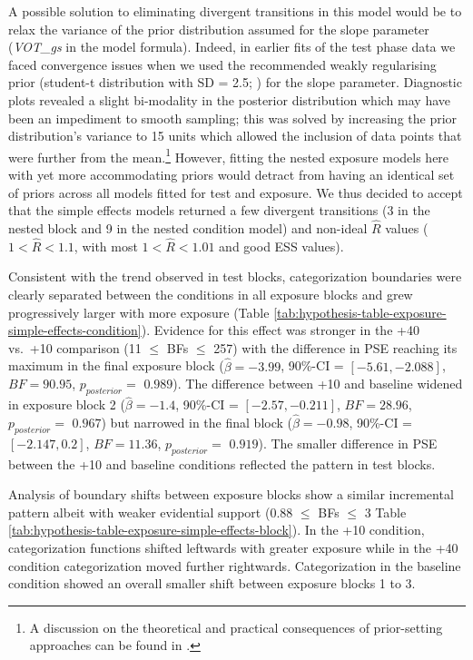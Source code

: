 \documentclass[
  11pt,
  man,mask,floatsintext]{apa6}
\begin{document}
A possible solution to eliminating divergent transitions in this model would be to relax the variance of the prior distribution assumed for the slope parameter (\emph{VOT\_gs} in the model formula). Indeed, in earlier fits of the test phase data we faced convergence issues when we used the recommended weakly regularising prior (student-t distribution with SD = 2.5; \textcite{gelman-prior2008}) for the slope parameter. Diagnostic plots revealed a slight bi-modality in the posterior distribution which may have been an impediment to smooth sampling; this was solved by increasing the prior distribution's variance to 15 units which allowed the inclusion of data points that were further from the mean.\footnote{A discussion on the theoretical and practical consequences of prior-setting approaches can be found in \autocite{gelman2017}.} However, fitting the nested exposure models here with yet more accommodating priors would detract from having an identical set of priors across all models fitted for test and exposure. We thus decided to accept that the simple effects models returned a few divergent transitions (3 in the nested block and 9 in the nested condition model) and non-ideal \(\hat{R}\) values (\(1< \hat{R} < 1.1\), with most \(1< \hat{R} < 1.01\) and good ESS values).

Consistent with the trend observed in test blocks, categorization boundaries were clearly separated between the conditions in all exposure blocks and grew progressively larger with more exposure (Table \ref{tab:hypothesis-table-exposure-simple-effects-condition}). Evidence for this effect was stronger in the +40 vs.~+10 comparison
(11 \(\leq\) BFs \(\leq\) 257) with the difference in PSE reaching its maximum in the final exposure block (\(\hat{\beta} = -3.99\), 90\%-CI = \([-5.61, -2.088]\), \(BF = 90.95\), \(p_{posterior} =\) \(0.989\)). The difference between +10 and baseline widened in exposure block 2 (\(\hat{\beta} = -1.4\), 90\%-CI = \([-2.57, -0.211]\), \(BF = 28.96\), \(p_{posterior} =\) \(0.967\)) but narrowed in the final block (\(\hat{\beta} = -0.98\), 90\%-CI = \([-2.147, 0.2]\), \(BF = 11.36\), \(p_{posterior} =\) \(0.919\)). The smaller difference in PSE between the +10 and baseline conditions reflected the pattern in test blocks.

Analysis of boundary shifts between exposure blocks show a similar incremental pattern albeit with weaker evidential support (0.88 \(\leq\) BFs \(\leq\) 3 Table \ref{tab:hypothesis-table-exposure-simple-effects-block}). In the +10 condition, categorization functions shifted leftwards with greater exposure while in the +40 condition categorization moved further rightwards. Categorization in the baseline condition showed an overall smaller shift between exposure blocks 1 to 3.
\end{document}
